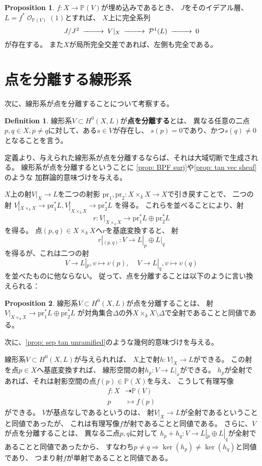 \documentclass[uplatex]{jsarticle}
\theoremstyle{definition}
\newtheorem{prop}[prop]{Proposition}
\newtheorem{defi}[defi]{Definition}
\renewcommand{\P}{\mathbb{P}}
\newcommand{\mcO}{\mathcal{O}}
\newcommand{\mcP}{\mathcal{P}}
\DeclareMathOperator{\OOO}{\mcO}
\newcommand{\OO}[1]{\OOO_{#1}}
\newcommand{\dto}{\dashrightarrow}
\begin{document}
\begin{prop}
  \(f:X\to \P(V)\)が埋め込みであるとき、
  \(J\)をそのイデアル層、\(L=f^*\OO{\P(V)}(1)\)とすれば、
  \(X\)上に完全系列
  \[
  \begin{CD}
    J/J^2 @>>> V|_X @>>> \mcP^1(L) @>>> 0
  \end{CD}
  \]
  が存在する。
  また\(X\)が局所完全交差であれば、左側も完全である。
\end{prop}




\section{点を分離する線形系}


次に、線形系が点を分離することについて考察する。


\begin{defi}
  線形系\(V\subset H^0(X,L)\)が\textbf{点を分離する}とは、
  異なる任意の二点\(p,q\in X , p\neq q\)に対して、ある\(s\in V\)が存在し、
  \(s(p)=0\)であり、かつ\(s(q)\neq 0\)となることを言う。
\end{defi}

定義より、与えられた線形系が点を分離するならば、それは大域切断で生成される。
線形系が点を分離するということに
\autoref{prop: BPF surj}や\autoref{prop: tan vec sheaf}のような
加群論的意味づけを与える。

\(X\)上の射\(V|_X\to L\)を二つの射影
\(\mathrm{pr}_1,\mathrm{pr}_2:X\times_kX\to X\)で引き戻すことで、
二つの射
\(V|_{X\times_kX}\to \mathrm{pr}_1^*L ,
V|_{X\times_kX}\to \mathrm{pr}_2^*L\)
を得る。
これらを並べることにより、射
\[
r:V|_{X\times_kX} \to \mathrm{pr}_1^*L\oplus \mathrm{pr}_2^*L
\]
を得る。
点\((p,q)\in X\times_kX\)へ\(r\)を基底変換すると、
射
\[
r|_{(p,q)}: V\to L|_p\oplus L|_q
\]
を得るが、これは二つの射
\[V\to L|_p, v\mapsto v(p), \ \ \ \ \ V\to L|_q, v\mapsto v(q)\]
を並べたものに他ならない。
従って、点を分離することは以下のように言い換えられる：

\begin{prop}
  線形系\(V\subset H^0(X,L)\)が点を分離することは、
  射\(V|_{X\times_kX}\to \mathrm{pr}_1^*L\oplus \mathrm{pr}_2^*L\)
  が対角集合\(\Delta\)の外\(X\times_kX\setminus \Delta\)で全射であることと同値である。
\end{prop}

次に、\autoref{prop: sep tan unramified}のような幾何的意味づけを与える。

線形系\(V\subset H^0(X,L)\)が与えられれば、
\(X\)上で射\(h:V|_X\to L\)ができる。
この射を点\(p\in X\)へ基底変換すれば、
線形空間の射\(h_p:V\to L|_x\)ができる。
\(h_p\)が全射であれば、それは射影空間の点\(f(p)\in \P(X)\)を与え、
こうして有理写像
\begin{align*}
  f:X &\dto \P(V) \\
  p &\mapsto f(p)
\end{align*}
ができる。
\(V\)が基点なしであるというのは、
射\(V|_X\to L\)が全射であるということと同値であったが、
これは有理写像\(f\)が射であることと同値である。
さらに、\(V\)が点を分離することは、
異なる二点\(p,q\)に対して
\(h_p+h_q:V\to L|_p\oplus L|_q\)が全射であることと同値であったから、
すなわち\(p\neq q \Rightarrow \ker(h_p)\neq \ker(h_q)\)と同値であり、
つまり射\(f\)が単射であることと同値である。
\end{document}
